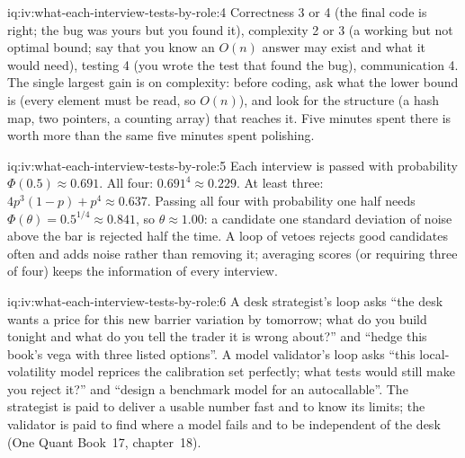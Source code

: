 \begin{solution}{iq:iv:what-each-interview-tests-by-role:4}
Correctness 3 or 4 (the final code is right; the bug was yours but you found it), complexity 2 or 3 (a working
but not optimal bound; say that you know an $O(n)$ answer may exist and what it would need), testing 4 (you
wrote the test that found the bug), communication 4. The single largest gain is on complexity: before coding,
ask what the lower bound is (every element must be read, so $O(n)$), and look for the structure (a hash map,
two pointers, a counting array) that reaches it. Five minutes spent there is worth more than the same five
minutes spent polishing.
\end{solution}

\begin{solution}{iq:iv:what-each-interview-tests-by-role:5}
Each interview is passed with probability $\Phi(0.5) \approx 0.691$. All four: $0.691^4 \approx 0.229$. At
least three: $4p^3(1-p) + p^4 \approx 0.637$. Passing all four with probability one half needs
$\Phi(\theta) = 0.5^{1/4} \approx 0.841$, so $\theta \approx 1.00$: a candidate one standard deviation of
noise above the bar is rejected half the time. A loop of vetoes rejects good candidates often and adds noise
rather than removing it; averaging scores (or requiring three of four) keeps the information of every
interview.
\end{solution}

\begin{solution}{iq:iv:what-each-interview-tests-by-role:6}
A desk strategist's loop asks ``the desk wants a price for this new barrier variation by tomorrow; what do you
build tonight and what do you tell the trader it is wrong about?'' and ``hedge this book's vega with three
listed options''. A model validator's loop asks ``this local-volatility model reprices the calibration set
perfectly; what tests would still make you reject it?'' and ``design a benchmark model for an autocallable''.
The strategist is paid to deliver a usable number fast and to know its limits; the validator is paid to find
where a model fails and to be independent of the desk (One Quant Book~17, chapter~18).
\end{solution}

